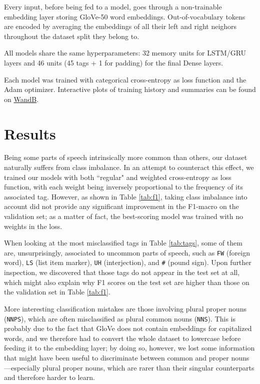 \documentclass[10pt]{article}
\newcommand{\fw}{\texttt{FW}}
\newcommand{\uh}{\texttt{UH}}
\newcommand{\pound}{\texttt{\#}}
\newcommand{\nnps}{\texttt{NNPS}}
\newcommand{\ls}{\texttt{LS}}
\newcommand{\nns}{\texttt{NNS}}
\begin{document}
Every input, before being fed to a model, goes through a non-trainable embedding layer storing GloVe-50 word embeddings. Out-of-vocabulary tokens are encoded by averaging the embeddings of all their left and right neighors throughout the dataset split they belong to. 

All models share the same hyperparameters: 32 memory units for LSTM/GRU layers and 46 units (45 tags + 1 for padding) for the final Dense layers.

Each model was trained with categorical cross-entropy as loss function and the Adam optimizer. Interactive plots of training history and summaries can be found on \href{https://wandb.ai/frantoman/NLP-POS-Tagging/reports/Model-Comparison-Training-Validation---VmlldzoxMjk0Nzc2}{WandB}. 


\section{Results}
Being some parts of speech intrinsically more common than others, our dataset naturally suffers from class imbalance. In an attempt to counteract this effect, we trained our models with both ``regular" and weighted cross-entropy as loss function, with each weight being inversely proportional to the frequency of its associated tag. However, as shown in Table \ref{tab:f1}, taking class imbalance into account did not provide any significant improvement in the F1-macro on the validation set; as a matter of fact, the best-scoring model was trained with no weights in the loss.

When looking at the most misclassified tags in Table \ref{tab:tags}, some of them are, unsurprisingly, associated to uncommon parts of speech, such as \fw{} (foreign word), \ls{} (list item marker), \uh{} (interjection), and \pound{} (pound sign). Upon further inspection, we discovered that those tags do not appear in the test set at all, which might also explain why F1 scores on the test set are higher than those on the validation set in Table \ref{tab:f1}. 

More interesting classification mistakes are those involving plural proper nouns (\nnps), which are often misclassified as plural common nouns (\nns). This is probably due to the fact that GloVe does not contain embeddings for capitalized words, and we therefore had to convert the whole dataset to lowercase before feeding it to the embedding layer; by doing so, however, we lost some information that might have been useful to discriminate between common and proper nouns---especially plural proper nouns, which are rarer than their singular counterparts and therefore harder to learn.
\end{document}
